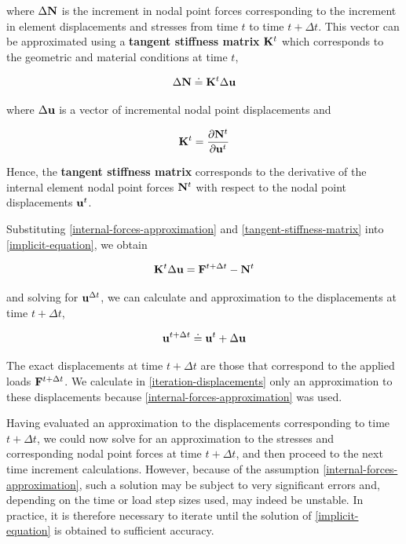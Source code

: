 where $ \Delta \mathbf{N} $ is the increment in nodal point forces corresponding
to the increment in element displacements and stresses from time $ t $ to time
$ t + \Delta t $. This vector can be approximated using a \textbf{tangent stiffness matrix}
$ \mathbf{K}^t $ which corresponds to the geometric and material conditions
at time $ t $,

\begin{equation}\label{internal-forces-approximation}
    \Delta \mathbf{N} \doteq \mathbf{K}^{t} \Delta \mathbf{u}
\end{equation}

where $ \Delta \mathbf{u} $ is a vector of incremental nodal point displacements and

\begin{equation}\label{tangent-stiffness-matrix}
    \mathbf{K}^{t} = \frac{\partial \mathbf{N}^{t}}{\partial \mathbf{u}^{t}}
\end{equation}

Hence, the \textbf{tangent stiffness matrix} corresponds to the derivative of the
internal element nodal point forces $ \mathbf{N}^{t} $ with respect to the
nodal point displacements $ \mathbf{u}^{t} $.

Substituting \eqref{internal-forces-approximation} and
\eqref{tangent-stiffness-matrix} into \eqref{implicit-equation}, we obtain

\begin{equation}\label{iteration-equation}
    \mathbf{K}^{t} \Delta \mathbf{u} = \mathbf{F}^{t + \Delta t} - \mathbf{N}^{t}
\end{equation}

and solving for $ \mathbf{u}^{\Delta t} $, we can calculate and approximation
to the displacements at time $ t + \Delta t $,

\begin{equation}\label{iteration-displacements}
    \mathbf{u}^{t + \Delta t} \doteq \mathbf{u}^{t} + \Delta \mathbf{u}
\end{equation}

The exact displacements at time $ t + \Delta t $ are those that correspond to the
applied loads $ \mathbf{F}^{t + \Delta t} $. We calculate in \eqref{iteration-displacements}
only an approximation to these displacements because \eqref{internal-forces-approximation}
was used.

Having evaluated an approximation to the displacements corresponding to
time $ t + \Delta t $, we could now solve for an approximation to the stresses and
corresponding nodal point forces at time $ t + \Delta t $, and then proceed to the
next time increment calculations. However, because of the assumption
\eqref{internal-forces-approximation}, such a solution may be subject to
very significant errors and, depending on the time or load step sizes used, may
indeed be unstable. In practice, it is therefore necessary to iterate until the
solution of \eqref{implicit-equation} is obtained to sufficient accuracy.


